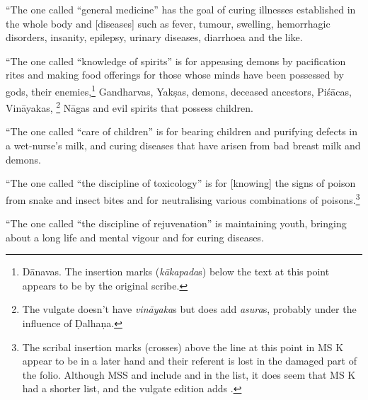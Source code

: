 \begin{translation}
    \item[8.3] 
    
“The one called “general medicine” has the goal of curing
illnesses established in the whole body and [diseases] such as fever,
tumour, swelling, hemorrhagic disorders, insanity, epilepsy, urinary
diseases, diarrhoea and the like.
    
    \item[8.4] 
    
“The one called “knowledge of spirits” is for
appeasing demons by pacification rites and making food offerings
for those whose minds have been possessed by gods, their
enemies,\footnote{Dānavas.  The insertion marks
    (\emph{kākapada}s) below the text at this point appears to be by
    the original scribe.} Gandharvas, Yakṣas, demons, deceased
    ancestors, Piśācas, Vināyakas, \footnote{The vulgate doesn't have
        \emph{vināyaka}s but does add \emph{asura}s, probably under the
        influence of Ḍalhaṇa.}
        Nāgas and evil spirits that possess children. %
    
    
    \item[8.5] 
    
“The one called “care of children” is for bearing children and
purifying defects in a wet-nurse's milk, and curing diseases that
have arisen from bad breast milk and demons.
    
    \item[8.6] 
    
“The one called “the discipline of toxicology” is for
    [knowing] the signs of poison from snake and insect bites and for
    neutralising various combinations of poisons.\footnote{The scribal
    insertion marks (crosses) above the line at this point in MS K appear to
    be in a later hand and their referent is lost in the damaged part of the
    folio.  Although MSS  and  include  and
     in the list, it does seem that MS K had
    a shorter list, and the vulgate edition adds .}
    
    \item[8.7] 
    
“The one called “the discipline of rejuvenation” is maintaining
youth, bringing about a long life and mental vigour and for curing
diseases.
    

\end{translation}
